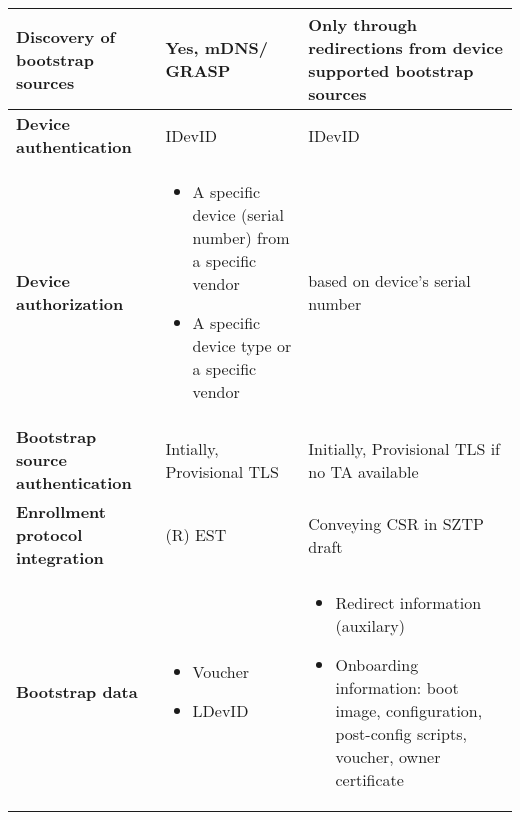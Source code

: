 \begin{landscape}
\begin{longtable}{|p{5cm}|l|l|}
		\hline
		\rowcolor[rgb]{ .745,  .804,  .843} \textbf{Discovery of bootstrap sources} & \cellcolor[rgb]{ 1,  1,  1}Yes, mDNS/ GRASP & \multicolumn{1}{p{18.335em}|}{\cellcolor[rgb]{ 1,  1,  1}Only through redirections from device supported bootstrap sources} \bigstrut\\

		\hline
		\rowcolor[rgb]{ .745,  .804,  .843} \textbf{Device authentication} & \cellcolor[rgb]{ 1,  1,  1}IDevID & \cellcolor[rgb]{ 1,  1,  1}IDevID \bigstrut\\

		\hline
		\rowcolor[rgb]{ .745,  .804,  .843} \textbf{Device authorization} & \multicolumn{1}{p{18.335em}|}{\cellcolor[rgb]{ 1,  1,  1} 
			\begin{itemize}[leftmargin=*, topsep=0pt, noitemsep]
			\item
				A specific device (serial number) from a specific vendor
			\item
				A specific device type or a specific vendor
			\end{itemize}
		}
		& \cellcolor[rgb]{ 1,  1,  1}based on device's serial number \bigstrut\\

		\hline
		\rowcolor[rgb]{ .745,  .804,  .843} \textbf{Bootstrap source authentication} & \cellcolor[rgb]{ 1,  1,  1}Intially, Provisional TLS & \cellcolor[rgb]{ 1,  1,  1}Initially, Provisional TLS if no TA available \bigstrut\\

		\hline
		\rowcolor[rgb]{ .745,  .804,  .843} \textbf{Enrollment protocol integration} & \cellcolor[rgb]{ 1,  1,  1}(R) EST & \cellcolor[rgb]{ 1,  1,  1}Conveying CSR in SZTP draft \cite{sztp-csr-draft} \bigstrut\\

		\hline
		\rowcolor[rgb]{ .745,  .804,  .843} \textbf{Bootstrap data} & \multicolumn{1}{p{18.335em}|}{\cellcolor[rgb]{ 1,  1,  1}
		\begin{itemize}[leftmargin=*, topsep=0pt, noitemsep]
			\item
				Voucher
			\item
				LDevID
		\end{itemize}
		} & \multicolumn{1}{p{18.335em}|}{\cellcolor[rgb]{ 1,  1,  1}
			\begin{itemize}[leftmargin=*, topsep=0pt, noitemsep]
			\item
			Redirect information (auxilary)
			\item
			Onboarding information: boot image, configuration, post-config scripts, voucher, owner certificate
		\end{itemize}
		} \bigstrut\\


\end{longtable}
\end{landscape}
